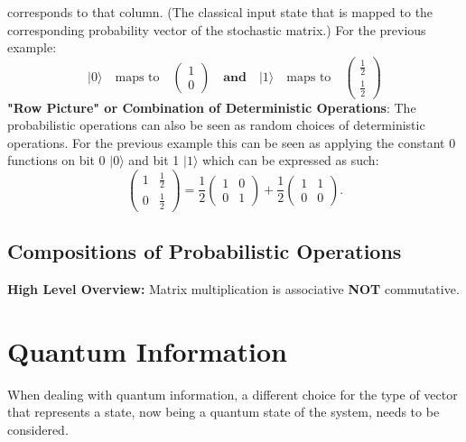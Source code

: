 \documentclass[11pt]{scrartcl}
\begin{document}
corresponds to that column. (The classical input state that is mapped to the corresponding probability vector of the stochastic matrix.) For the previous example: 
$$\vert 0 \rangle \quad \text{maps to}\quad \begin{pmatrix}1 \\ 0\end{pmatrix} \quad\textbf{and}\quad \vert 1 \rangle \quad \text{maps to}\quad \begin{pmatrix}\frac{1}{2} \\ \frac{1}{2}\end{pmatrix}$$\vspace{2mm}
\newline
\textbf{"Row Picture" or Combination of Deterministic Operations}: The probabilistic operations can also be seen as
random choices of deterministic operations. For the previous example this can be seen as applying the constant 0 functions on bit 0 $\vert 0 \rangle$ and bit 1 $\vert 1 \rangle$ which can be expressed as such:
\[
\begin{pmatrix}
1 & \frac{1}{2} \\
0 & \frac{1}{2}
\end{pmatrix}
=
\frac{1}{2}
\begin{pmatrix}
1 & 0 \\
0 & 1
\end{pmatrix}
+
\frac{1}{2}
\begin{pmatrix}
1 & 1 \\
0 & 0
\end{pmatrix}
.
\]
\subsection{Compositions of Probabilistic Operations}
\textbf{High Level Overview:} Matrix multiplication is associative \textbf{NOT} commutative.
\section{Quantum Information}
When dealing with quantum information, a different choice for the type of vector that represents a state,
now being a quantum state of the system, needs to be considered.
\end{document}
